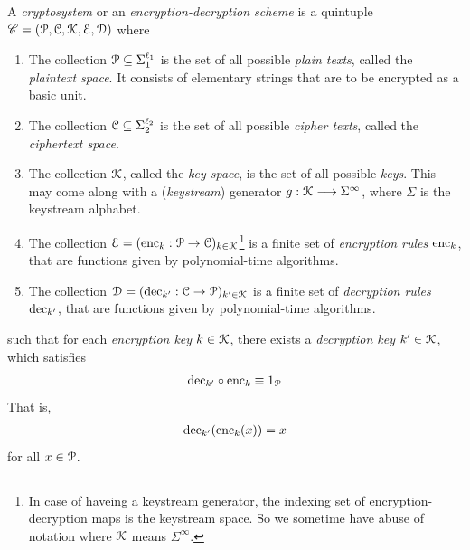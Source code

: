 \documentclass[a4paper, 12pt]{book} %
\begin{document}
\begin{definition}
    A \emph{cryptosystem} or an \emph{encryption-decryption scheme} is a quintuple $\mathscr{C} = (\EuScript{P}, \EuScript{C}, \EuScript{K}, \EuScript{E}, \EuScript{D})$ where 
    \begin{enumerate}
        \item The collection $\EuScript{P} \subseteq \Sigma_1^{\ell_1}$ is the set of all possible \emph{plain texts}, called the \emph{plaintext space}. It consists of elementary strings that are to be encrypted as a basic unit.
        \item The collection $\EuScript{C}  \subseteq \Sigma_2^{\ell_2}$ is the set of all possible \emph{cipher texts}, called the \emph{ciphertext space}.
        \item The collection $\EuScript{K}$, called the \emph{key space}, is the set of all possible \emph{keys}. This may come along with a (\emph{keystream}) generator $g: \EuScript{K} \longrightarrow \Sigma^\infty$, where $\Sigma$ is the keystream alphabet.
        \item The collection $\EuScript{E} = (\mathrm{enc}_k: \EuScript{P} \rightarrow \EuScript{C})_{k \in \EuScript{K}}$\footnote{In case of haveing a keystream generator, the indexing set of encryption-decryption maps is the keystream space. So we sometime have abuse of notation where $\EuScript{K}$ means $\Sigma^{\infty}$.} is a finite set of \emph{encryption rules} $\mathrm{enc}_k$, that are functions given by polynomial-time algorithms.
        \item The collection $\EuScript{D} = (\mathrm{dec}_{k'}: \EuScript{C} \rightarrow \EuScript{P} )_{k' \in \EuScript{K}}$ is a finite set of \emph{decryption rules} $\mathrm{dec}_{k'}$, that are functions given by polynomial-time algorithms.
    \end{enumerate}
    such that for each \emph{encryption key} $k \in \EuScript{K}$, there exists a \emph{decryption key} $k' \in \EuScript{K}$, which satisfies
    \begin{align}
        \mathrm{dec}_{k'} \circ \mathrm{enc}_k \equiv 1_{\EuScript{P}}
    \end{align}
    That is, 
    \begin{align}
        \mathrm{dec}_{k'}(\mathrm{enc}_k(x)) = x
    \end{align}
    for all $x \in \EuScript{P}$.
\end{definition}
\end{document}
